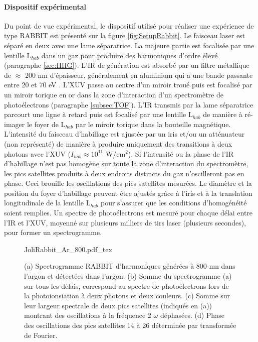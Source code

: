 \paragraph{Dispositif expérimental} Du point de vue expérimental, le dispositif utilisé pour réaliser une expérience de type RABBIT est présenté sur la figure \ref{fig:SetupRabbit}. Le faisceau laser est séparé en deux avec une lame séparatrice. La majeure partie est focalisée par une lentille L$_{hab}$ dans un gaz pour produire des harmoniques d'ordre élevé (paragraphe \ref{sec:HHG}). L'IR de génération est absorbé par un filtre métallique de $\approx$ 200 nm d'épaisseur, généralement en aluminium qui a une bande passante entre 20 et 70 eV . L'XUV passe au centre d'un miroir troué puis est focalisé par un miroir torique en or dans la zone d'interaction d'un spectromètre de photoélectrons (paragraphe \ref{subsec:TOF}). L'IR transmis par la lame séparatrice parcourt une ligne à retard puis est focalisé par une lentille L$_{hab}$ de manière à ré-imager le foyer de L$_{hab}$ par le miroir torique dans la bouteille magnétique. L'intensité du faisceau d'habillage est ajustée par un iris et/ou un atténuateur (non représenté) de manière à produire uniquement des transitions à deux photons avec l'XUV ($I_{hab} \approx 10^{11}$ W/cm$^2$). Si l'intensité ou la phase de l'IR d'habillage n'est pas homogène sur toute la zone d'interaction du spectromètre, les pics satellites produits à deux endroits distincts du gaz n'oscilleront pas en phase. Ceci brouille les oscillations des pics satellites mesurées. Le diamètre et la position du foyer d'habillage peuvent être ajustés grâce à l'iris et à la translation longitudinale de la lentille L$_{hab}$ pour s'assurer que les conditions d'homogénéité soient remplies. Un spectre de photoélectrons est mesuré pour chaque délai entre l'IR et l'XUV, moyenné sur plusieurs milliers de tirs laser (plusieurs secondes), pour former un spectrogramme.

\begin{figure}
\centering
\def\svgwidth{\columnwidth}
{JoliRabbit_Ar_800.pdf_tex}
\caption{(a) Spectrogramme RABBIT d'harmoniques générées à 800 nm dans l'argon et détectées dans l'argon. (b) Somme du spectrogramme (a) sur tous les délais, correspond au spectre de photoélectrons lors de la photoionsiation à deux photons et deux couleurs. (c) Somme sur leur largeur spectrale de deux pics satellites (indiqués en (a)) montrant des oscillations à la fréquence 2 $\omega$ déphasées. (d) Phase des oscillations des pics satellites 14 à 26 déterminée par transformée de Fourier.}
\label{fig:JoliRabbit}
\end{figure}

